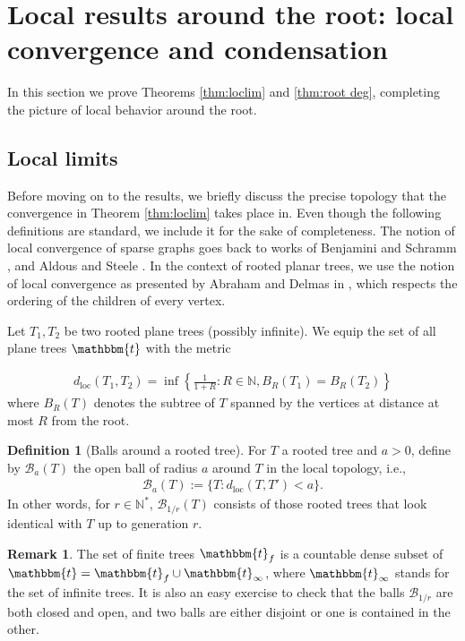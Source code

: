 \documentclass{article}
\newcommand{\1}{\mathbbm{1}}								%
\theoremstyle{definition}
\newtheorem{definition}[theorem]{Definition}
\newtheorem{remark}[theorem]{Remark}
\numberwithin{equation}{section}
\begin{document}
\section{Local results around the root: local convergence and condensation}\label{sec:loc_results}
In this section we prove Theorems \ref{thm:loclim} and \ref{thm:root deg}, completing the picture of local behavior around the root.

\subsection{Local limits}\label{sec:local_conv_prelims}

Before moving on to the results, we briefly discuss the precise topology that the convergence in Theorem \ref{thm:loclim} takes place in. Even though the following definitions are standard, we include it for the sake of completeness. The notion of local convergence of sparse graphs goes back to works of Benjamini and Schramm \cite{BSc01}, and Aldous and Steele \cite{AS04}. In the context of rooted planar trees, we use the notion of local convergence as presented by Abraham and Delmas in \cite{abraham2015introduction}, which respects the ordering of the children of every vertex.

Let $T_1, T_2$ be two rooted plane trees (possibly infinite). We equip the set of all plane trees $\mathbbm{t}$ with the metric

\begin{align*}
    d_{\mathrm{loc}}(T_1,T_2)= \inf \left\{\frac{1}{1+R} : R \in \mathbb{N}, B_R(T_1)=B_R(T_2) \right\}
\end{align*} where $B_R(T)$ denotes the subtree of $T$ spanned by the vertices at distance at most $R$ from the root. 

\begin{definition}[Balls around a rooted tree]
  For $T$ a rooted tree and $a>0$, define by $\mathcal{B}_{a}(T)$ the open ball of radius $a$ around $T$ in the local topology, i.e.,
  \begin{align*}
      \mathcal{B}_{a}(T):=\{T:d_{\mathrm{loc}}(T,T') < a \}.
  \end{align*}
  In other words, for $r\in \mathbb{N}^*$, $\mathcal{B}_{1/r}(T)$ consists of those rooted trees that look identical with $T$ up to generation $r$.
\end{definition}

\begin{remark} \label{rem:loclim}
The set of finite trees $\mathbbm{t}_{f}$ is a countable dense subset of $\mathbbm{t} = \mathbbm{t}_f \cup \mathbbm{t}_\infty$, where $\mathbbm{t}_\infty$ stands for the set of infinite trees. It is also an easy exercise to check that the balls $\mathcal{B}_{1/r}$ are both closed and open, and two balls are either disjoint or one is contained in the other.
\end{remark}
\end{document}
